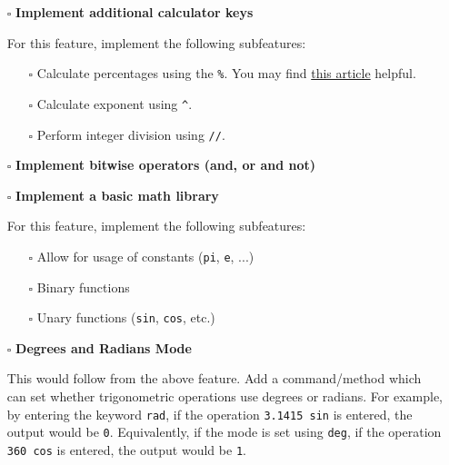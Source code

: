 \documentclass{article}
\begin{document}
\begin{itemize}
  \item[$\square$] \textbf{Implement additional calculator keys}
  
  For this feature, implement the following subfeatures:
	\begin{itemize}
	\item[$\square$] Calculate percentages using the \texttt{\%}. You may find \href{https://blogs.msdn.microsoft.com/oldnewthing/20080110-00/?p=23853}{this article} helpful.
	\end{itemize}
	\begin{itemize}
	\item[$\square$] Calculate exponent using \texttt{\^}.
	\end{itemize}
	\begin{itemize}
	\item[$\square$] Perform integer division using \texttt{//}.
	\end{itemize}
\end{itemize}

\begin{itemize}
  \item[$\square$] \textbf{Implement bitwise operators (and, or and not)}
\end{itemize}

\begin{itemize}
  \item[$\square$] \textbf{Implement a basic math library}
  
  For this feature, implement the following subfeatures:
  \begin{itemize}
	\item[$\square$] Allow for usage of constants (\texttt{pi}, \texttt{e}, ...)
	\end{itemize}
	\begin{itemize}
	\item[$\square$] Binary functions
	\end{itemize}
	\begin{itemize}
	\item[$\square$] Unary functions (\texttt{sin}, \texttt{cos}, etc.)
	\end{itemize}
\end{itemize}

\begin{itemize}
  \item[$\square$] \textbf{Degrees and Radians Mode}
  
	This would follow from the above feature. Add a command/method which can set whether trigonometric operations use degrees or radians. For example, by entering the keyword \texttt{rad}, if the operation \texttt{3.1415 sin} is entered, the output would be \texttt{0}. Equivalently, if the mode is set using \texttt{deg}, if the operation \texttt{360 cos} is entered, the output would be \texttt{1}.\newline
\end{itemize}
\end{document}
